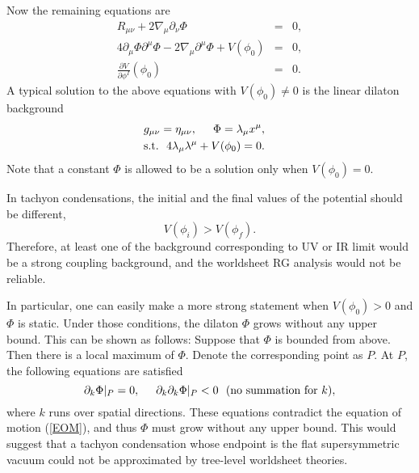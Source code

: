 \documentclass[a4paper,a4paper]{article}
\begin{document}
Now the remaining equations are 
\begin{eqnarray}
R_{\mu\nu}+2\nabla_\mu\partial_\nu\Phi &=& 0, \\
4\partial_\mu\Phi\partial^\mu\Phi-2\nabla_\mu\partial^\mu\Phi+V(\phi_0) &=& 0, 
       \label{EOM} \\
\frac{\partial V}{\partial\phi^I}(\phi_0) &=& 0.
\end{eqnarray}
A typical solution to the above equations with $V(\phi_0)\ne0$ is the linear dilaton background 
\begin{eqnarray}
& g_{\mu\nu} = \eta_{\mu\nu}, \hspace{5mm} \Phi = \lambda_\mu x^\mu, & \\
& \mbox{s.t.}\ \ 4\lambda_\mu\lambda^\mu+V(\phi_0) = 0. & \nonumber
\end{eqnarray}
Note that a constant $\Phi$ is allowed to be a solution only when $V(\phi_0)=0$. 

In tachyon condensations, the initial and the final values of the potential should be different,
\begin{equation}
V(\phi_i) > V(\phi_f).
\end{equation}
Therefore, at least one of the background corresponding to UV or IR limit would be a strong coupling background, 
and the worldsheet RG analysis would not be reliable. 

In particular, one can easily make a more strong statement when $V(\phi_0)>0$ and $\Phi$ is static. 
Under those conditions, the dilaton $\Phi$ grows without any upper bound. 
This can be shown as follows: 
Suppose that $\Phi$ is bounded from above. 
Then there is a local maximum of $\Phi$. 
Denote the corresponding point as $P$. 
At $P$, the following equations are satisfied
\begin{equation}
\partial_k\Phi|_P=0, \hspace{5mm} \partial_k\partial_k\Phi|_P<0\ \ (\mbox{no summation for }k),
\end{equation}
where $k$ runs over spatial directions. 
These equations contradict the equation of motion (\ref{EOM}), and thus $\Phi$ must grow without any upper bound. 
This would suggest that a tachyon condensation whose endpoint is the flat supersymmetric vacuum could not be 
approximated by tree-level worldsheet theories. 
\end{document}
